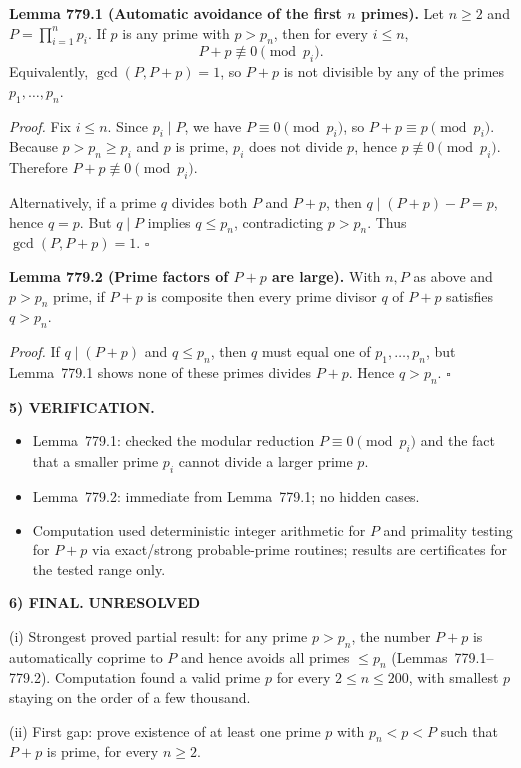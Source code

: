 \medskip
\noindent\textbf{Lemma 779.1 (Automatic avoidance of the first $n$ primes).}
Let $n\ge 2$ and $P=\prod_{i=1}^n p_i$. If $p$ is any prime with $p>p_n$, then for every $i\le n$,
\[
P+p\not\equiv 0\pmod{p_i}.
\]
Equivalently, $\gcd(P,P+p)=1$, so $P+p$ is not divisible by any of the primes $p_1,\dots,p_n$.

\noindent\emph{Proof.}
Fix $i\le n$. Since $p_i\mid P$, we have $P\equiv 0\pmod{p_i}$, so $P+p\equiv p\pmod{p_i}$.
Because $p>p_n\ge p_i$ and $p$ is prime, $p_i$ does not divide $p$, hence $p\not\equiv 0\pmod{p_i}$. Therefore $P+p\not\equiv 0\pmod{p_i}$.

Alternatively, if a prime $q$ divides both $P$ and $P+p$, then $q\mid (P+p)-P=p$, hence $q=p$. But $q\mid P$ implies $q\le p_n$, contradicting $p>p_n$. Thus $\gcd(P,P+p)=1$. \hfill $\square$

\medskip
\noindent\textbf{Lemma 779.2 (Prime factors of $P+p$ are large).}
With $n,P$ as above and $p>p_n$ prime, if $P+p$ is composite then every prime divisor $q$ of $P+p$ satisfies $q>p_n$.

\noindent\emph{Proof.}
If $q\mid (P+p)$ and $q\le p_n$, then $q$ must equal one of $p_1,\dots,p_n$, but Lemma~779.1 shows none of these primes divides $P+p$. Hence $q>p_n$. \hfill $\square$

\medskip
\noindent\textbf{5) VERIFICATION.}

\begin{itemize}
\item Lemma~779.1: checked the modular reduction $P\equiv 0\pmod{p_i}$ and the fact that a smaller prime $p_i$ cannot divide a larger prime $p$.
\item Lemma~779.2: immediate from Lemma~779.1; no hidden cases.
\item Computation used deterministic integer arithmetic for $P$ and primality testing for $P+p$ via exact/strong probable-prime routines; results are certificates for the tested range only.
\end{itemize}

\medskip
\noindent\textbf{6) FINAL.} \textbf{UNRESOLVED}

(i) Strongest proved partial result: for any prime $p>p_n$, the number $P+p$ is automatically coprime to $P$ and hence avoids all primes $\le p_n$ (Lemmas~779.1--779.2). Computation found a valid prime $p$ for every $2\le n\le 200$, with smallest $p$ staying on the order of a few thousand.

(ii) First gap: prove existence of at least one prime $p$ with $p_n<p<P$ such that $P+p$ is prime, for every $n\ge 2$.

